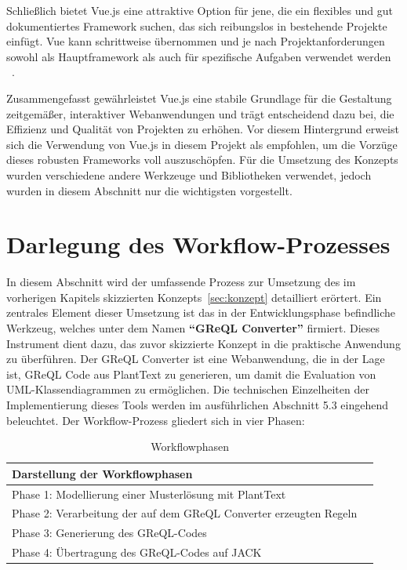 Schließlich bietet Vue.js eine attraktive Option für jene, die ein flexibles und gut dokumentiertes Framework suchen,
das sich reibungslos in bestehende Projekte einfügt. Vue kann schrittweise übernommen und je nach Projektanforderungen
sowohl als Hauptframework als auch für spezifische Aufgaben verwendet werden ~\cite{wohlgethan2018supportingweb}.

Zusammengefasst gewährleistet Vue.js eine stabile Grundlage für die Gestaltung zeitgemäßer, interaktiver Webanwendungen
und trägt entscheidend dazu bei, die Effizienz und Qualität von Projekten zu erhöhen. Vor diesem Hintergrund erweist
sich die Verwendung von Vue.js in diesem Projekt als empfohlen, um die Vorzüge dieses robusten Frameworks voll
auszuschöpfen. Für die Umsetzung des Konzepts wurden verschiedene andere Werkzeuge und Bibliotheken verwendet, jedoch
wurden in diesem Abschnitt nur die wichtigsten vorgestellt.

\section{Darlegung des Workflow-Prozesses}\label{sec:darlegung-des-workflow-prozesses}

In diesem Abschnitt wird der umfassende Prozess zur Umsetzung des im vorherigen Kapitels skizzierten Konzepts~\ref{sec:konzept}
detailliert erörtert. Ein zentrales Element dieser Umsetzung ist das in der Entwicklungsphase befindliche
Werkzeug, welches unter dem Namen \textbf{``\gls{GReQL Converter}''} firmiert. Dieses Instrument dient dazu, das zuvor skizzierte
Konzept in die praktische Anwendung zu überführen. Der \gls{GReQL Converter} ist eine Webanwendung, die in der Lage ist,
GReQL Code aus PlantText zu generieren, um damit die Evaluation von UML-Klassendiagrammen zu ermöglichen. Die
technischen Einzelheiten der Implementierung dieses Tools werden im ausführlichen Abschnitt 5.3 eingehend beleuchtet.
Der Workflow-Prozess gliedert sich in vier Phasen:

\begin{table}[h!]
    \centering
    \caption{Workflowphasen}\label{tab:phasen}
    \begin{tabular}{ll}
        \toprule
        \textbf{Darstellung der Workflowphasen} \\
        \midrule
        Phase 1: Modellierung einer Musterlösung mit PlantText \\
        Phase 2: Verarbeitung der auf dem \gls{GReQL Converter} erzeugten Regeln \\
        Phase 3: Generierung des GReQL-Codes \\
        Phase 4: Übertragung des GReQL-Codes auf JACK \\
        \bottomrule
    \end{tabular}
\end{table}

